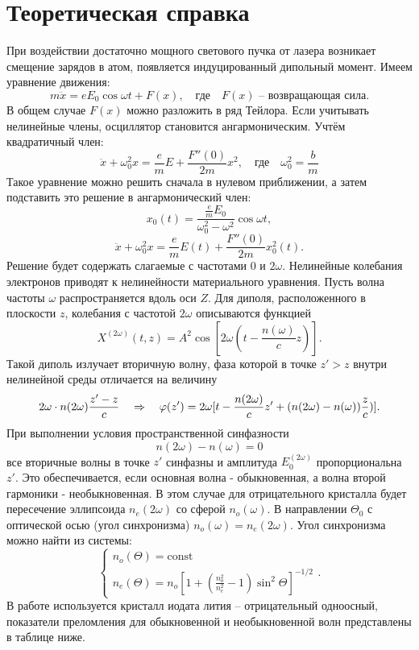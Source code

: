 \section*{Теоретическая справка}
При воздействии достаточно мощного светового пучка от лазера возникает смещение зарядов в атом, появляется индуцированный дипольный момент. Имеем уравнение движения:
\[m \ddot{x} = eE_0 \cos \omega t + F(x), \quad \text{где} \quad F(x) \text{ -- возвращающая сила}.\]
\n
В общем случае $F(x)$ можно разложить в ряд Тейлора. Если учитывать нелинейные члены, осциллятор становится ангармоническим. Учтём квадратичный член:
\[\ddot{x} + \omega_0^2 x = \frac{e}{m}E + \frac{F''(0)}{2m}x^2, \quad \text{где} \quad \omega_0^2 = \frac{b}{m}\]
\n
Такое уравнение можно решить сначала в нулевом приближении, а затем подставить это решение в ангармонический член:
\[x_0(t) = \frac{\frac{e}{m}E_0}{\omega_0^2 - \omega^2}\cos \omega t,\]
\[\ddot{x} + \omega_0^2 x = \frac{e}{m}E(t) + \frac{F''(0)}{2m}x_0^2(t).\]
\n
Решение будет содержать слагаемые с частотами $0$ и $2\omega$. Нелинейные колебания электронов приводят к нелинейности материального уравнения.
\n\n
Пусть волна частоты $\omega$ распространяется вдоль оси $Z$. Для диполя, расположенного в плоскости $z$, колебания с частотой $2\omega$ описываются функцией
\[X^{(2\omega)}(t, z) = A^2 \cos [2\omega (t -\frac{n(\omega)}{c} z)].\]
\n
Такой диполь излучает вторичную волну, фаза которой в точке $z' > z$ внутри нелинейной среды отличается на величину
\[2\omega \cdot n(2\omega) \frac{z' - z}{c} \quad \Rightarrow \quad \varphi (z') = 2\omega [t - \frac{n(2\omega)}{c} z' + (n(2\omega) - n(\omega))\frac{z}{c})].\]
\n
При выполнении условия пространственной синфазности
\[n(2\omega) - n(\omega) = 0\]
\n
все вторичные волны в точке $z'$ синфазны и амплитуда $E_0^{(2\omega)}$ пропорциональна $z'$. Это обеспечивается, если основная волна - обыкновенная, а волна второй гармоники - необыкновенная. В этом случае для отрицательного кристалла будет пересечение эллипсоида $n_e (2\omega)$ со сферой $n_o (\omega)$.
\n\n
В направлении $\Theta_0$ с оптической осью (угол синхронизма) $n_o (\omega) = n_e (2\omega)$. Угол синхронизма можно найти из системы:
\begin{equation*}
\begin{cases}
   n_o (\Theta) = \text{const}\\
   n_e (\Theta) = n_o [1 + (\frac{n_o^2}{n_e^2} - 1)\sin ^2 \Theta]^{-1/2}
 \end{cases}.
\end{equation*}
\n
В работе используется кристалл иодата лития -- отрицательный одноосный, показатели преломления для обыкновенной и необыкновенной волн представлены в таблице ниже.
